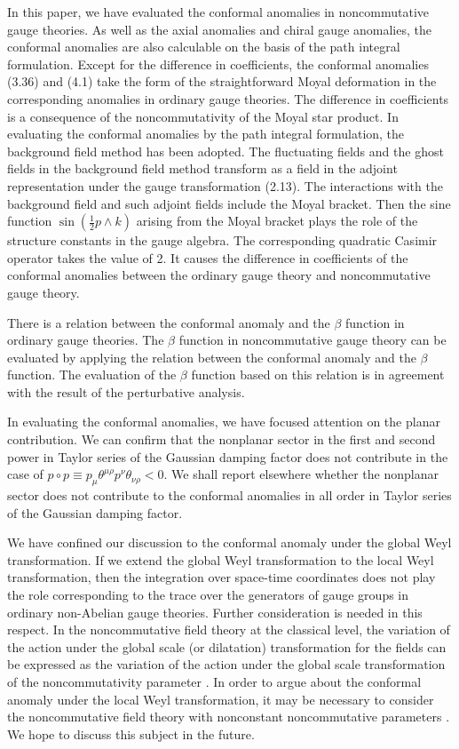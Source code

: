 \documentclass[a4paper,12pt]{article}
\begin{document}
In this paper, we have evaluated the conformal anomalies in noncommutative 
gauge theories. As well as the axial anomalies and chiral gauge anomalies, 
the conformal anomalies are also calculable on the basis of the path integral 
formulation. Except for the difference in coefficients, the conformal 
anomalies (3.36) and (4.1) take the form of the straightforward Moyal 
deformation in the corresponding anomalies in ordinary gauge theories. 
The difference in coefficients is a consequence of the noncommutativity of the 
Moyal star product. 
In evaluating the conformal anomalies by the path integral formulation, 
the background field method has been adopted. The fluctuating fields and 
the ghost fields in the background field method transform as a field in the 
adjoint representation under the gauge transformation (2.13). 
The interactions with the background field and such adjoint fields include 
the Moyal bracket. Then the sine function $\sin(\frac{1}{2}p \wedge k)$ 
arising from the Moyal bracket plays the role of the structure constants in 
the gauge algebra. The corresponding quadratic Casimir operator takes the 
value of 2. It causes the difference in coefficients of the conformal 
anomalies between the ordinary gauge theory and noncommutative gauge theory. 

There is a relation between the conformal anomaly and the $\beta$ function 
in ordinary gauge theories. The $\beta$ function in noncommutative gauge 
theory can be evaluated by applying the relation between the conformal anomaly 
and the $\beta$ function. The evaluation of the $\beta$ function based on this 
relation is in agreement with the result of the perturbative analysis. 

In evaluating the conformal anomalies, we have focused attention on the 
planar contribution. We can confirm that the nonplanar sector in the first 
and second power in Taylor series of the Gaussian damping factor does not 
contribute in the case of 
$p \circ p \equiv p_{\mu}\theta^{\mu\rho}p^{\nu}\theta_{\nu\rho} < 0$. 
We shall report elsewhere whether the nonplanar sector does not 
contribute to the conformal anomalies in all order in Taylor series of the 
Gaussian damping factor. 


We have confined our discussion to the conformal anomaly under the global 
Weyl transformation. If we extend the global Weyl transformation to the local 
Weyl transformation, then the integration over space-time coordinates does not 
play the role corresponding to the trace over the generators of gauge groups 
in ordinary non-Abelian gauge theories. 
Further consideration is needed in this respect. 
In the noncommutative field theory at the classical level, the 
variation of the action under the global scale (or dilatation) transformation 
for the fields can be expressed as the variation of the action under the 
global scale transformation of the noncommutativity 
parameter \cite{AGJGHGLPMSRW}. 
In order to argue about the conformal anomaly under the local Weyl 
transformation, it may be necessary to consider the noncommutative field 
theory with nonconstant noncommutative parameters \cite{PMHSPM}. 
We hope to discuss this subject in the future. 
\end{document}
